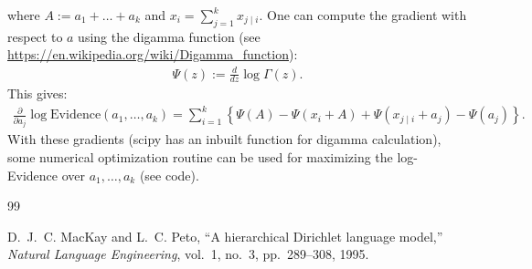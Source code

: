 \documentclass{scrartcl}
\begin{document}
where $A := a_1 + \dots + a_k$ and $x_i = \sum_{j=1}^k x_{j \mid
  i}$. One can compute the gradient with respect to $a$ 
using the digamma function (see
\url{https://en.wikipedia.org/wiki/Digamma_function}):
\begin{align*}
  \Psi(z) := \frac{d}{dz} \log \Gamma(z). 
\end{align*}
This gives:
\begin{align*}
 \frac{\partial}{\partial a_j} \log \text{Evidence}(a_1, \dots, a_k)
  = \sum_{i=1}^k \left\{\Psi(A) - \Psi(x_i + A) + \Psi(x_{j \mid i} +
  a_j) - \Psi(a_j) \right\}. 
\end{align*}
With these gradients (scipy has an inbuilt function for digamma
calculation), some numerical optimization routine can be used for
maximizing the log-Evidence over $a_1, \dots, a_k$ (see code). 



\begin{thebibliography}{99}

D.~J.~C. MacKay and L.~C. Peto,
\newblock ``A hierarchical Dirichlet language model,''
\newblock \emph{Natural Language Engineering}, vol.~1,
no.~3, pp.~289--308, 1995.

  

  







\end{thebibliography}
\end{document}
